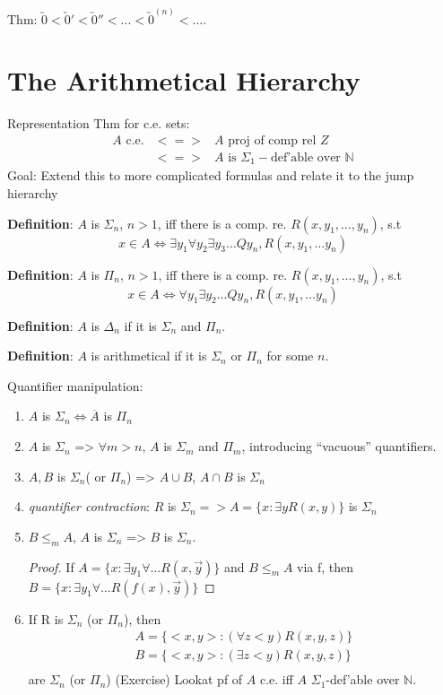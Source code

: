 \documentclass[12pt]{article}
\newcommand{\Nat}{\ensuremath{\mathbb{N}}}
\newcommand{\Conj}[1]{\ensuremath{\overline{#1}}}
\newcommand{\defn}{\textbf{Definition}: }
\begin{document}
Thm: $\utilde{0} < \utilde{0}' < \utilde{0}'' < \ldots < \utilde{0}^{(n)} < \ldots$.

\section*{The Arithmetical Hierarchy}

Representation Thm for c.e. sets:
\begin{align*}
 A \text{ c.e.} &<=>& A \text{ proj of comp rel } Z \\
&<=>& A \text{ is  } \Sigma_1-\text{def'able over } \Nat
\end{align*}
Goal: Extend this to more complicated formulas and relate it to the jump hierarchy

\defn $A$ is $\Sigma_n$, $n > 1$, iff there is
	a comp. re. $R(x, y_1, \ldots, y_n)$, s.t
\[
 x \in A \Leftrightarrow \exists y_1 \forall y_2 \exists y_3 \ldots Q y_n, R(x, y_1, \ldots y_n)
\]

\defn $A$ is $\Pi_n$, $n > 1$, iff there is
	a comp. re. $R(x, y_1, \ldots, y_n)$, s.t
\[
 x \in A \Leftrightarrow \forall y_1 \exists y_2 \ldots Q y_n, R(x, y_1, \ldots y_n)
\]

\defn $A$ is $\Delta_n$ if it is $\Sigma_n$ and $\Pi_n$.

\defn $A$ is arithmetical if it is $\Sigma_n$ or $\Pi_n$ for some $n$.

Quantifier manipulation:
\begin{enumerate}[(1)]
 \item $A$ is $\Sigma_n \Leftrightarrow \Conj{A}$ is $\Pi_n$
 \item $A$ is $\Sigma_n$ => $\forall m > n$, $A$ is $\Sigma_m$ and $\Pi_m$, 
	introducing ``vacuous'' quantifiers.
 \item $A,B$ is $\Sigma_n$( or $\Pi_n$)	=> $A \cup B$, $A \cap B$ is $\Sigma_n$
 \item \emph{quantifier contraction}:
	$R$ is $\Sigma_n	=> A = \{x : \exists y R(x,y) \}$ is $\Sigma_n$
 \item $B \le_m A$, $A$ is $\Sigma_n$ => $B$ is $\Sigma_n$.
   \begin{proof}
	If $A = \{ x : \exists y_1 \forall \ldots R(x, \vec{y}) \}$
	and $B \le_m A$ via f,
	then $B = \{ x : \exists y_1 \forall \ldots R(f(x), \vec{y}) \}$
      \end{proof}

 \item If R is $\Sigma_n$ (or $\Pi_n$), then
	\begin{align*}
          A = \{ <x, y> : (\forall z < y) R(x,y,z) \} \\
          B = \{ <x, y> : (\exists z < y) R(x,y,z) \} \\
	\end{align*}
	are $\Sigma_n$ (or $\Pi_n$)
		\proof (Exercise) Lookat pf of $A$ c.e. iff $A$ $\Sigma_1$-def'able over $\Nat$.

\end{enumerate}
\end{document}
